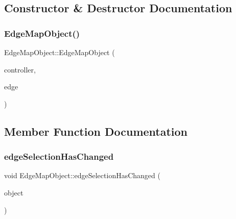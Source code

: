 \subsection{Constructor \& Destructor Documentation}
\mbox{\label{class_edge_map_object_a539163cd70096071278b18b1501e3838}} 
\subsubsection{\texorpdfstring{EdgeMapObject()}{EdgeMapObject()}}
{\footnotesize\ttfamily Edge\+Map\+Object\+::\+Edge\+Map\+Object (\begin{DoxyParamCaption}\item[{\mbox{\hyperlink{class_map_objects_controller}{Map\+Objects\+Controller}} $\ast$}]{controller,  }\item[{std\+::shared\+\_\+ptr$<$ \mbox{\hyperlink{struct_node_data_1_1_edge}{Node\+Data\+::\+Edge}} $>$}]{edge }\end{DoxyParamCaption})}



\subsection{Member Function Documentation}
\mbox{\label{class_edge_map_object_aa3e1087fc4df5083dc8fc0ad6010eeb7}} 
\subsubsection{\texorpdfstring{edgeSelectionHasChanged}{edgeSelectionHasChanged}}
{\footnotesize\ttfamily void Edge\+Map\+Object\+::edge\+Selection\+Has\+Changed (\begin{DoxyParamCaption}\item[{\mbox{\hyperlink{class_edge_map_object}{Edge\+Map\+Object}} $\ast$}]{object }\end{DoxyParamCaption})\hspace{0.3cm}{\ttfamily [signal]}}

\mbox{\label{class_edge_map_object_a5a67249e9896a6931eb5e4819e069c00}} 
